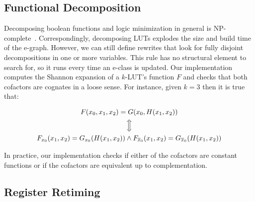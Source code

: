 \subsection{Functional Decomposition}\label{sec:rewrites:decomp}

Decomposing boolean functions and logic minimization in general is
NP-complete~\cite{logicmin}. Correspondingly, decomposing LUTs explodes the
size and build time of the e-graph. However, we can still define rewrites that
look for fully disjoint decompositions in one or more variables. This rule has
no structural element to search for, so it runs every time an e-class is
updated. Our implementation computes the Shannon expansion of a $k$-LUT's
function $F$ and checks that both cofactors are cognates in a loose sense. For
instance, given $k=3$ then it is true that:

\begin{gather}
    F(x_0, x_1, x_2) = G(x_0, H(x_1, x_2)) \nonumber \\
    \Big\Updownarrow                       \nonumber \\
    F_{x_0} (x_1, x_2) = G_{x_0} (H(x_1, x_2)) \land F_{\overline{x}_0} (x_1, x_2) = G_{\overline{x}_0} (H(x_1, x_2))
\end{gather}

In practice, our implementation checks if either of the cofactors are constant
functions or if the cofactors are equivalent up to complementation.

\subsection{Register Retiming}\label{sec:rewrites:retiming}

